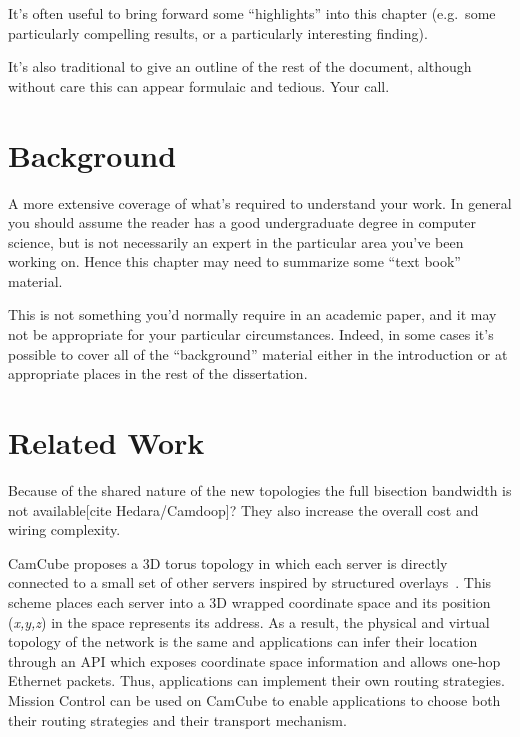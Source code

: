 \documentclass[a4paper,12pt,twoside,openright]{report}
\begin{document}
It's often useful to bring forward some ``highlights'' into 
this chapter (e.g.\ some particularly compelling results, or 
a particularly interesting finding). 

It's also traditional to give an outline of the rest of the
document, although without care this can appear formulaic 
and tedious. Your call. 


\chapter{Background} 

A more extensive coverage of what's required to understand your 
work. In general you should assume the reader has a good undergraduate 
degree in computer science, but is not necessarily an expert in 
the particular area you've been working on. Hence this chapter 
may need to summarize some ``text book'' material. 

This is not something you'd normally require in an academic paper, 
and it may not be appropriate for your particular circumstances. 
Indeed, in some cases it's possible to cover all of the ``background'' 
material either in the introduction or at appropriate places in 
the rest of the dissertation. 


\chapter{Related Work} 

Because of the shared nature of the new topologies the full bisection bandwidth
is not available[cite Hedara/Camdoop]? They also increase the overall cost and
wiring complexity.

CamCube proposes a 3D torus topology in which each server is directly connected
to a small set of other servers inspired by structured
overlays~\cite{Abu-Libdeh:2010:SRF}. This scheme places each server into a 3D
wrapped coordinate space and its position (\emph{x,y,z}) in the space represents
its address. As a result, the physical and virtual topology of the network is
the same and applications can infer their location through an API which exposes
coordinate space information and allows one-hop Ethernet packets. Thus,
applications can implement their own routing strategies. Mission Control can be
used on CamCube to enable applications to choose both their routing strategies
and their transport mechanism.
\end{document}
